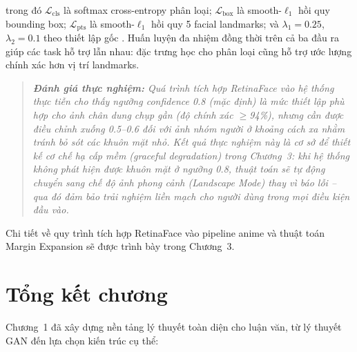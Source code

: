 \noindent trong đó $\mathcal{L}_{\text{cls}}$ là softmax cross-entropy phân loại; $\mathcal{L}_{\text{box}}$ là smooth-$\ell_1$ hồi quy bounding box; $\mathcal{L}_{\text{pts}}$ là smooth-$\ell_1$ hồi quy 5 facial landmarks; và $\lambda_1 = 0.25$, $\lambda_2 = 0.1$ theo thiết lập gốc \cite{Deng2019RetinaFace}. Huấn luyện đa nhiệm đồng thời trên cả ba đầu ra giúp các task hỗ trợ lẫn nhau: đặc trưng học cho phân loại cũng hỗ trợ ước lượng chính xác hơn vị trí landmarks.

\begin{quote}
\textit{\textbf{Đánh giá thực nghiệm:} Quá trình tích hợp RetinaFace vào hệ thống thực tiễn cho thấy ngưỡng confidence 0.8 (mặc định) là mức thiết lập phù hợp cho ảnh chân dung chụp gần (độ chính xác $\geq$94\%), nhưng cần được điều chỉnh xuống 0.5--0.6 đối với ảnh nhóm người ở khoảng cách xa nhằm tránh bỏ sót các khuôn mặt nhỏ. Kết quả thực nghiệm này là cơ sở để thiết kế cơ chế hạ cấp mềm (graceful degradation) trong Chương~3: khi hệ thống không phát hiện được khuôn mặt ở ngưỡng 0.8, thuật toán sẽ tự động chuyển sang chế độ ảnh phong cảnh (Landscape Mode) thay vì báo lỗi -- qua đó đảm bảo trải nghiệm liền mạch cho người dùng trong mọi điều kiện đầu vào.}
\end{quote}

Chi tiết về quy trình tích hợp RetinaFace vào pipeline anime và thuật toán Margin Expansion sẽ được trình bày trong Chương~3.

\newpage
\section*{Tổng kết chương}

Chương~1 đã xây dựng nền tảng lý thuyết toàn diện cho luận văn, từ lý thuyết GAN đến lựa chọn kiến trúc cụ thể:

